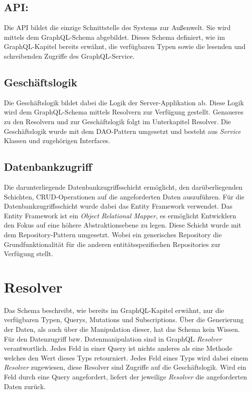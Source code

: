 \subsection{API:}
Die API bildet die einzige Schnittstelle des Systems zur Außenwelt.
Sie wird mittels dem GraphQL-Schema abgebildet.
Dieses Schema definiert, wie im GraphQL-Kapitel bereits erwähnt, die verfügbaren Typen sowie die lesenden und schreibenden Zugriffe des GraphQL-Service.

\subsection{Geschäftslogik}
Die Geschäftslogik bildet dabei die Logik der Server-Applikation ab.
Diese Logik wird dem GraphQL-Schema mittels Resolvern zur Verfügung gestellt.
Genaueres zu den Resolvern und zur Geschäftslogik folgt im Unterkapitel Resolver.
Die Geschäftslogik wurde mit dem DAO-Pattern umgesetzt und besteht aus \textit{Service} Klassen und zugehörigen Interfaces.

\subsection{Datenbankzugriff}
Die darunterliegende Datenbankzugriffsschicht ermöglicht, den darüberliegenden Schichten, CRUD-Operationen auf die angeforderten Daten auszuführen.
Für die Datenbankzugriffsschicht wurde dabei das Entity Framework verwendet.
Das Entity Framework ist ein \textit{Object Relational Mapper}, es ermöglicht Entwicklern den Fokus auf eine höhere Abstraktionsebene zu legen.
Diese Schicht wurde mit dem Repository-Pattern umgesetzt.
Wobei ein generisches Repository die Grundfunktionalität für die anderen entitätsspezifischen Repositories zur Verfügung stellt.

\section{Resolver}
Das Schema beschreibt, wie bereits im GraphQL-Kapitel erwähnt, nur die verfügbaren Typen, Querys, Mutations und Subscriptions.
Über die Generierung der Daten, als auch über die Manipulation dieser, hat das Schema kein Wissen.
Für den Datenzugriff bzw. Datenmanipulation sind in GraphQL \textit{Resolver} verantwortlich.
Jedes Feld in einer Query ist nichts anderes als eine Methode welches den Wert dieses Typs retourniert.
Jedes Feld eines Typs wird dabei einem \textit{Resolver} zugewiesen, diese Resolver sind Zugriffe auf die Geschäftslogik.
Wird ein Feld durch eine Query angefordert, liefert der jeweilige \textit{Resolver} die angeforderten Daten zurück.

